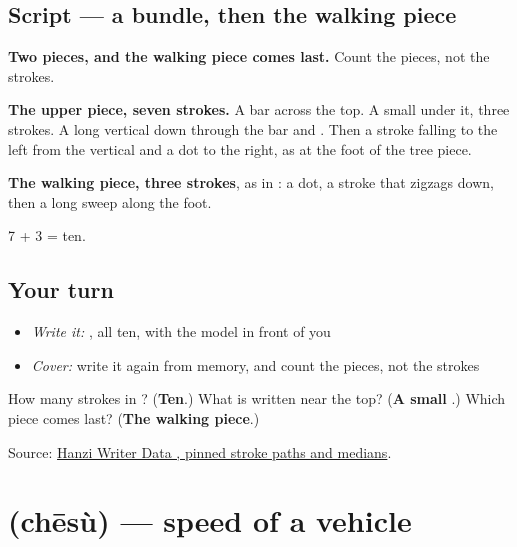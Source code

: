 \subsection*{Script — a bundle, then the walking piece}

\begin{quote}
\end{quote}

\textbf{Two pieces, and the walking piece comes last.} Count the pieces, not the strokes.

\textbf{The upper piece, seven strokes.} A bar across the top. A small  under it, three strokes. A long vertical down through the bar and . Then a stroke falling to the left from the vertical and a dot to the right, as at the foot of the tree piece.

\textbf{The walking piece, three strokes}, as in : a dot, a stroke that zigzags down, then a long sweep along the foot.

7 + 3 = ten.

\subsection*{Your turn}
\begin{itemize}
\raggedright
  \item \emph{Write it:} , all ten, with the model in front of you
  \item \emph{Cover:} write it again from memory, and count the pieces, not the strokes
\end{itemize}

\begin{tcolorbox}[breakable,colback=teal!4,colframe=teal!35!black,title={Before you move on}]
How many strokes in ? (\textbf{Ten}.) What is written near the top? (\textbf{A small }.) Which piece comes last? (\textbf{The walking piece}.)

Source: \href{https://raw.githubusercontent.com/chanind/hanzi-writer-data/68d10a4b21150cae5e1ebbd223eed289cf32d90c/data/\%E9\%80\%9F.json}{Hanzi Writer Data , pinned stroke paths and medians}.
\end{tcolorbox}
\section[\texorpdfstring{\zh{车速} (chēsù)}{车速 (chēsù)}]{ (chēsù) — speed of a vehicle}

